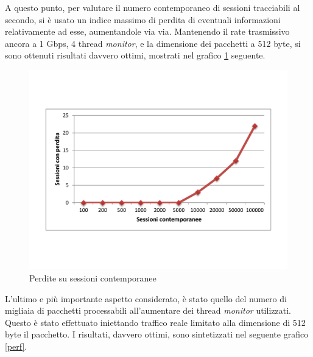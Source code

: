 \clearpage
A questo punto, per valutare il numero contemporaneo di sessioni tracciabili al secondo, si è usato un indice massimo di perdita di eventuali informazioni relativamente ad esse, aumentandole via via. Mantenendo il rate trasmissivo ancora a 1 Gbps, 4 thread \emph{monitor}, e la dimensione dei pacchetti a 512 byte, si sono ottenuti risultati davvero ottimi, mostrati nel grafico \ref{sess} seguente.

\begin{figure}[H] %
\begin{center}
\includegraphics[scale=0.5]{img/sess.pdf}
\caption{Perdite su sessioni contemporanee}\label{sess}
\end{center}
\end{figure}

\clearpage
L'ultimo e più importante aspetto considerato, è stato quello del numero di migliaia di pacchetti processabili all'aumentare dei thread \emph{monitor} utilizzati. Questo è stato effettuato iniettando traffico reale limitato alla dimensione di 512 byte il pacchetto. I risultati, davvero ottimi, sono sintetizzati nel seguente grafico \ref{perf}.

